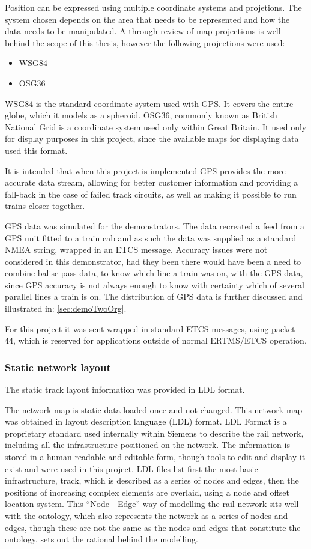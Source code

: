 Position can be expressed using multiple coordinate systems and projetions. The system chosen depends on the area that needs to be represented and how the data needs to be manipulated. A through review of map projections is well behind the scope of this thesis, however the following projections were used:
\begin{itemize}
    \item WSG84
    \item OSG36
\end{itemize}
WSG84 is the standard coordinate system used with GPS. It covers the entire globe, which it models as a spheroid. OSG36, commonly known as British National Grid is a coordinate system used only within Great Britain. It used only for display purposes in this project, since the available maps for displaying data used this format. 

It is intended that when this project is implemented GPS provides the more accurate data stream, allowing for better customer information and providing a fall-back in the case of failed track circuits, as well as making it possible to run trains closer together.

GPS data was simulated for the demonstrators. The data recreated a feed from a GPS unit fitted to a train cab and as such the data was supplied as a standard NMEA string, wrapped in an ETCS message. Accuracy issues were not considered in this demonstrator, had they been there would have been a need to combine balise pass data, to know which line a train was on, with the GPS data, since GPS accuracy is not always enough to know with certainty which of several parallel lines a train is on. The distribution of GPS data is further discussed and illustrated in: \autoref{sec:demoTwoOrg}.

For this project it was sent wrapped in standard ETCS messages, using packet 44, which is reserved for applications outside of normal ERTMS/ETCS operation.

    \subsubsection{Static network layout}
The static track layout information was provided in LDL format.

The network map is static data loaded once and not changed. This network map was obtained in layout description language (LDL) format. LDL Format is a proprietary standard used internally within Siemens to describe the rail network, including all the infrastructure positioned on the network. The information is stored in a human readable and editable form, though tools to edit and display it exist and were used in this project. LDL files list first the most basic infrastructure, track, which is described as a series of nodes and edges, then the positions of increasing complex elements are overlaid, using a node and offset location system. This ``Node - Edge'' way of modelling the rail network sits well with the ontology, which also represents the network as a series of nodes and edges, though these are not the same as the nodes and edges that constitute the ontology. \citet{Tutcher2015} sets out the rational behind the modelling.

